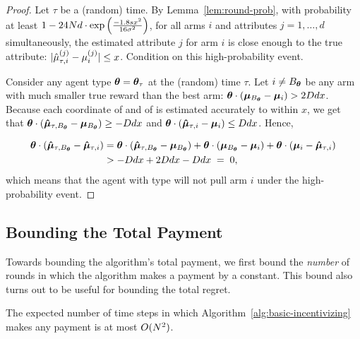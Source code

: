 \begin{proof}
Let $\tau$ be a (random) time.
By Lemma~\ref{lem:round-prob},
with probability at least
$1 - 24 N d \cdot \exp \left( \frac{-1.8 s x^2}{16\sigma^2} \right)$,
for all arms $i$ and attributes $j = 1, \ldots, d$ simultaneously,
the estimated attribute $j$ for arm $i$ is close enough to the true attribute: 
$|\hat{\mu}_{\tau,i}^{(j)} - \mu_{i}^{(j)}| \leq x$.
Condition on this high-probability event.

Consider any agent type $\bm{\theta} = \bm{\theta}_{\tau}$ at the (random) time
$\tau$.
Let $i \neq B_{\bm{\theta}}$ be any arm
with much smaller true reward than the best arm:
$\bm{\theta} \cdot (\bm{\mu}_{B_{\bm{\theta}}} - \bm{\mu}_{i}) > 2D d x$.
Because each coordinate of \ArmEV{\tau}{\Best{\AgV}} and of
 is estimated accurately to within $x$, 
we get that 
$\bm{\theta} \cdot (\bm{\hat{\mu}}_{\tau,B_{\bm{\theta}}} - \bm{\mu}_{B_{\bm{\theta}}})
\geq - D d x$
and
$\bm{\theta} \cdot (\bm{\hat{\mu}}_{\tau,i} - \bm{\mu}_{i}) \leq D d x$.
Hence, 

\begin{align}
\bm{\theta} \cdot (\bm{\hat{\mu}}_{\tau,B_{\bm{\theta}}} - \bm{\hat{\mu}}_{\tau,i})
& =
\bm{\theta} \cdot (\bm{\hat{\mu}}_{\tau,B_{\bm{\theta}}} - \bm{\mu}_{B_{\bm{\theta}}})
+ \bm{\theta} \cdot (\bm{\mu}_{B_{\bm{\theta}}} - \bm{\mu}_{i})
+ \bm{\theta} \cdot (\bm{\mu}_{i} - \bm{\hat{\mu}}_{\tau,i}) \nonumber\\
& > -D d x + 2 D d x - D d x
\; = \; 0, \label{equ:choice}
\end{align}
which means that the agent with type \AgV will not pull arm $i$
under the high-probability event.
\end{proof}

\subsection{Bounding the Total Payment}

Towards bounding the algorithm's total payment, we first bound the
\emph{number} of rounds in which the algorithm makes a payment by a
constant.
This bound also turns out to be useful for bounding the total regret.

\begin{lemma} \label{lem:numP}
The expected number of time steps in which
Algorithm~\ref{alg:basic-incentivizing}
makes any payment is at most $O(N^2)$.
\end{lemma}

